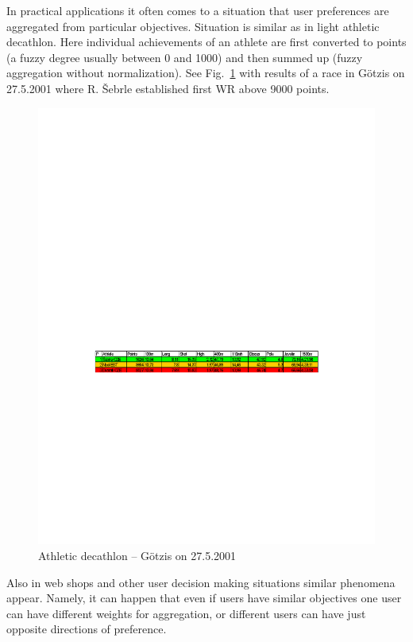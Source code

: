     In practical applications it often comes to a situation that user preferences are aggregated from particular objectives. Situation is similar as in light athletic decathlon. Here individual achievements of an athlete are first converted to points (a fuzzy degree usually between 0 and 1000) and then summed up (fuzzy aggregation without normalization). See Fig.~\ref{fig:img4} with results of a race in G\"{o}tzis on 27.5.2001 where R. \v{S}ebrle established  first WR  above 9000 points.

\begin{figure}[htbp]
	\centering
		\includegraphics[width=1.00\textwidth]{img/img4}
	\caption{Athletic decathlon -- G\"{o}tzis on 27.5.2001}
	\label{fig:img4}
\end{figure}


Also in web shops and other user decision making situations similar phenomena appear. Namely, it can happen that even if users have similar objectives one user can have different weights for aggregation, or different users can have just opposite directions of preference. 

